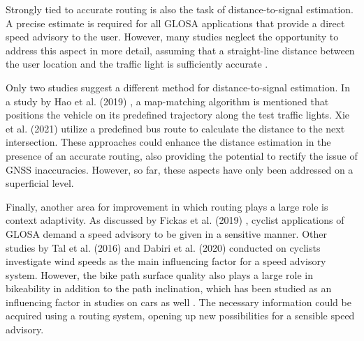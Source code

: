 Strongly tied to accurate routing is also the task of distance-to-signal estimation. A precise estimate is required for all GLOSA applications that provide a direct speed advisory to the user. However, many studies neglect the opportunity to address this aspect in more detail, assuming that a straight-line distance between the user location and the traffic light is sufficiently accurate \cite{iglesias_i2v_2008, katsaros_performance_2011, koukoumidis_signalguru_2011, koukoumidis_leveraging_2012, krause_traffic_2012, li_open_2012, stevanovic_green_2013, stevanovic_comparative_2014, eckhoff_potentials_2013, gajananan_cooperative_2013, tal_vehicular-communications-based_2016, bernais_design_2016, stebbins_characterising_2017, sharara_impact_2019}. 

Only two studies suggest a different method for distance-to-signal estimation. In a study by Hao et al. (2019) \cite{hao_eco-approach_2019}, a map-matching algorithm is mentioned that positions the vehicle on its predefined trajectory along the test traffic lights. Xie et al. (2021) \cite{xie_dynamic_2021} utilize a predefined bus route to calculate the distance to the next intersection. These approaches could enhance the distance estimation in the presence of an accurate routing, also providing the potential to rectify the issue of GNSS inaccuracies. However, so far, these aspects have only been addressed on a superficial level.

Finally, another area for improvement in which routing plays a large role is context adaptivity. As discussed by Fickas et al. (2019) \cite{fickas_fast_2019}, cyclist applications of GLOSA demand a speed advisory to be given in a sensitive manner. Other studies by Tal et al. (2016) \cite{tal_vehicular-communications-based_2016} and Dabiri et al. (2020) \cite{dabiri_optimized_2020} conducted on cyclists investigate wind speeds as the main influencing factor for a speed advisory system. However, the bike path surface quality also plays a large role in bikeability \cite{wasserman_evaluating_2019} in addition to the path inclination, which has been studied as an influencing factor in studies on cars as well \cite{zhang_green_2020}. The necessary information could be acquired using a routing system, opening up new possibilities for a sensible speed advisory.

